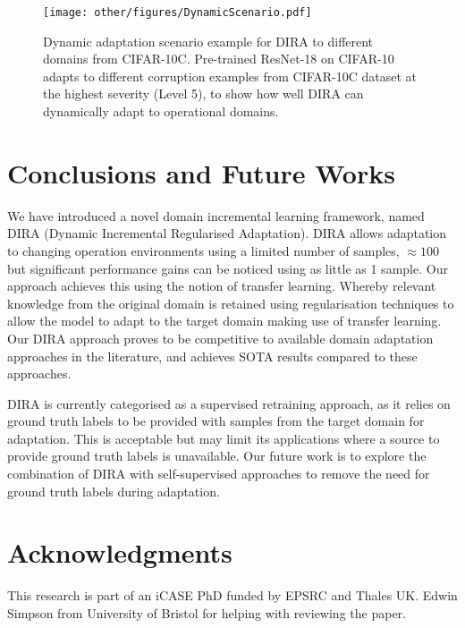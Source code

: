 \begin{figure}[]
    \centering
    \texttt{[image: other/figures/DynamicScenario.pdf]}
    \caption{Dynamic adaptation scenario example for DIRA to different domains from CIFAR-10C. Pre-trained ResNet-18 on CIFAR-10 adapts to different corruption examples from CIFAR-10C dataset at the highest severity (Level 5), to show how well DIRA can dynamically adapt to operational domains.}
    \label{fig:DynamicScenario}
\end{figure}

\section{Conclusions and Future Works} \label{sec:conclusions}
We have introduced a novel domain incremental learning framework, named DIRA (Dynamic Incremental Regularised Adaptation). 
%
DIRA allows adaptation to changing operation environments using a limited number of samples, $\approx 100$ but significant performance gains can be noticed using as little as 1 sample. 
%
Our approach achieves this using the notion of transfer learning. 
%
Whereby relevant knowledge from the original domain is retained using regularisation techniques to allow the model to adapt to the target domain making use of transfer learning.
%
Our DIRA approach proves to be competitive to available domain adaptation approaches in the literature, and achieves SOTA results compared to these approaches.  

DIRA is currently categorised as a supervised retraining approach, as it relies on ground truth labels to be provided with samples from the target domain for adaptation. 
%
This is acceptable but may limit its applications where a source to provide ground truth labels is unavailable. 
%
Our future work is to explore the combination of DIRA with self-supervised approaches to remove the need for ground truth labels during adaptation.

\section*{Acknowledgments}
This research is part of an iCASE PhD funded by EPSRC and Thales UK. %
Edwin Simpson from University of Bristol for helping with reviewing the paper.
